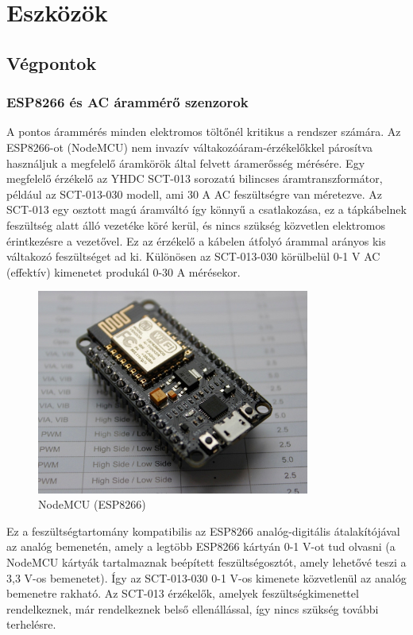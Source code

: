 \section{Eszközök}

\subsection{Végpontok}

\subsubsection{ESP8266 és AC árammérő szenzorok}

A pontos árammérés minden elektromos töltőnél kritikus a rendszer számára. 
Az ESP8266-ot (NodeMCU) nem invazív váltakozóáram-érzékelőkkel 
párosítva használjuk a megfelelő áramkörök által felvett áramerősség mérésére. Egy megfelelő
érzékelő az YHDC SCT-013 sorozatú bilincses áramtranszformátor, például az SCT-013-030 modell, 
ami 30 A AC  feszültségre van méretezve. Az SCT-013 egy osztott magú áramváltó így könnyű a 
csatlakozása, ez a tápkábelnek feszültség alatt 
álló vezetéke köré kerül, és nincs szükség közvetlen elektromos érintkezésre a vezetővel. 
Ez az érzékelő a kábelen átfolyó árammal arányos kis váltakozó feszültséget 
ad ki. Különösen az SCT-013-030 körülbelül 0-1 V AC (effektív) kimenetet produkál 0-30 A mérésekor.
\cite{simplyexplained:emonlib}

\begin{figure}[!ht]
    \centering
    \includegraphics[width=0.8\textwidth, keepaspectratio]{figures/NodeMCU.jpg}
    \caption{NodeMCU (ESP8266) \cite{patel_nodemcu}} 
\end{figure}

Ez a feszültségtartomány kompatibilis az ESP8266 analóg-digitális átalakítójával az analóg bemenetén, 
amely a legtöbb ESP8266 kártyán 0-1 V-ot tud olvasni (a NodeMCU kártyák tartalmaznak beépített 
feszültségosztót, amely lehetővé teszi a 3,3 V-os bemenetet). Így az SCT-013-030 0-1 V-os kimenete 
közvetlenül az analóg bemenetre rakható.
Az SCT-013 érzékelők, amelyek feszültségkimenettel rendelkeznek, 
már rendelkeznek belső ellenállással, így nincs szükség további terhelésre.
\cite{openenergymonitor}


